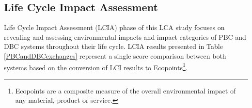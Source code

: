 \documentclass[conference]{IEEEtran}
\begin{document}

\subsection{Life Cycle Impact Assessment}
Life Cycle Impact Assessment (LCIA) phase of this LCA study focuses on revealing and assessing environmental impacts and impact categories of PBC and DBC systems throughout their life cycle. LCIA results presented in Table \ref{PBCandDBCexchanges} represent a single score comparison between both systems based on the conversion of LCI results to Ecopoints\footnote{Ecopoints are a composite measure of the overall environmental impact of any material, product or service.}.
\end{document}
